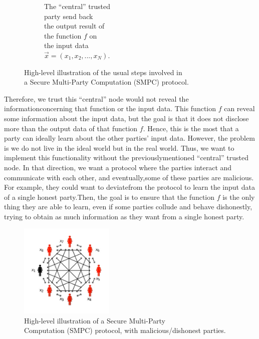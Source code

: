 \documentclass[12pt]{article}
\begin{document}
\begin{figure}[ht]
\begin{subfigure}{.33\textwidth}
            \caption{The ``central'' trusted\\ party send back\\ the output result of\\ the function $f$ on\\ the input data\\ $\vec{x} = ({x}_{1}, {x}_{2}, ..., {x}_{N})$.}
            \label{fig:secure-multi-party-computation-protocol-step-3}
        \end{subfigure}
        \caption{High-level illustration of the usual steps involved in\\ a Secure Multi-Party Computation (SMPC) protocol.}
        \label{fig:secure-multi-party-computation-protocol-steps}
    \end{figure}
    
    \noindent Therefore, we trust this ``central'' node would not reveal the information\break concerning that function or the input data. This function $f$ can reveal some information about the input data, but the goal is that it does not disclose more than the output data of that function $f$. Hence, this is the most that a party can ideally learn about the other parties' input data. However, the problem is we do not live in the ideal world but in the real world. Thus, we want to implement this functionality without the previously\break mentioned ``central'' trusted node. In that direction, we want a protocol where the parties interact and communicate with each other, and eventually,\break some of these parties are malicious. For example, they could want to deviate\break from the protocol to learn the input data of a single honest party.\break Then, the goal is to ensure that the function $f$ is the only thing they are able to learn, even if some parties collude and behave dishonestly, trying to obtain as much information as they want from a single honest party.

   \begin{figure}[ht]
        \captionsetup{justification=centering}
        \centering
        \includegraphics[width=0.4\textwidth]{figures/images/img-4.pdf}
        \caption{High-level illustration of a Secure Multi-Party\\ Computation (SMPC) protocol, with malicious/dishonest parties.}
    \end{figure}
\end{document}
